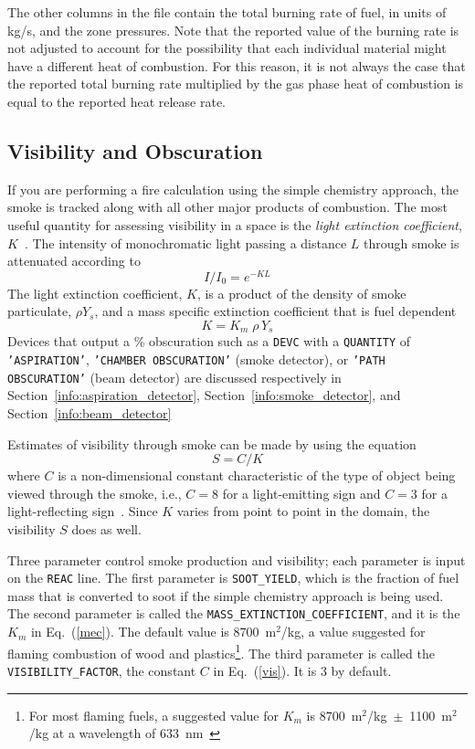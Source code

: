 \documentclass[11pt]{book}
\newcommand{\ct}{\tt\small}
\newcommand{\be}{\begin{equation}}
\newcommand{\ee}{\end{equation}}
\begin{document}
The other columns in the file contain the total burning rate of
fuel, in units of kg/s, and the zone pressures. Note that the reported value of the burning rate is not adjusted to account for the possibility that each individual
material might have a different heat of combustion. For this reason, it is not always the case that the reported total
burning rate multiplied by the gas phase heat of combustion is equal to the reported heat release rate.







\subsection{Visibility and Obscuration}
\label{info:visibility}
\label{info:obscuration}

If you are performing a fire calculation using the simple chemistry
approach, the smoke is tracked along with all other major products of
combustion. The most useful quantity for assessing visibility in a
space is the {\em light extinction coefficient},
$K$~\cite{SFPE:Mulholland}. The intensity of monochromatic light
passing a distance $L$ through smoke is attenuated according to
\be I/I_0 = e^{-KL} \ee
The light extinction coefficient, $K$, is a product of the
density of smoke particulate, $\rho Y_s$, and a mass specific
extinction coefficient that is fuel dependent
\be K = K_m \; \rho \, Y_s \label{mec} \ee
Devices that output a \% obscuration such as a {\ct DEVC} with a {\ct QUANTITY} of {\ct 'ASPIRATION'}, {\ct 'CHAMBER OBSCURATION'} (smoke
detector), or {\ct 'PATH OBSCURATION'} (beam detector) are discussed
respectively in Section~\ref{info:aspiration_detector},
Section~\ref{info:smoke_detector}, and Section~\ref{info:beam_detector}

Estimates of visibility through smoke can be made by using the
equation
\be  S = C/K  \label{vis}  \ee
where $C$ is a non-dimensional constant characteristic of
the type of object being viewed through the smoke, i.e.,
$C=8$ for a light-emitting sign and $C=3$ for a light-reflecting
sign~\cite{SFPE:Mulholland}. Since $K$ varies from point to point in the
domain, the visibility $S$ does as well.

Three parameter control smoke production and visibility; each
parameter is input on the {\ct REAC} line. The first parameter
is {\ct SOOT\_YIELD}, which is the fraction of fuel mass that
is converted to soot if the simple chemistry approach is being used. The second parameter is called the
{\ct MASS\_EXTINCTION\_COEFFICIENT}, and it is the $K_m$ in
Eq.~(\ref{mec}). The default value is 8700~m$^2$/kg, a value
suggested for flaming combustion of wood and plastics\footnote{For most flaming fuels, a suggested value for $K_m$ is 8700~m$^2$/kg~$\pm$~1100~m$^2$/kg at a
wavelength of 633~nm~\cite{Mulholland:F+M}}.
The third parameter is called the {\ct VISIBILITY\_FACTOR}, the
constant $C$ in Eq.~(\ref{vis}). It is 3 by default.
\end{document}
